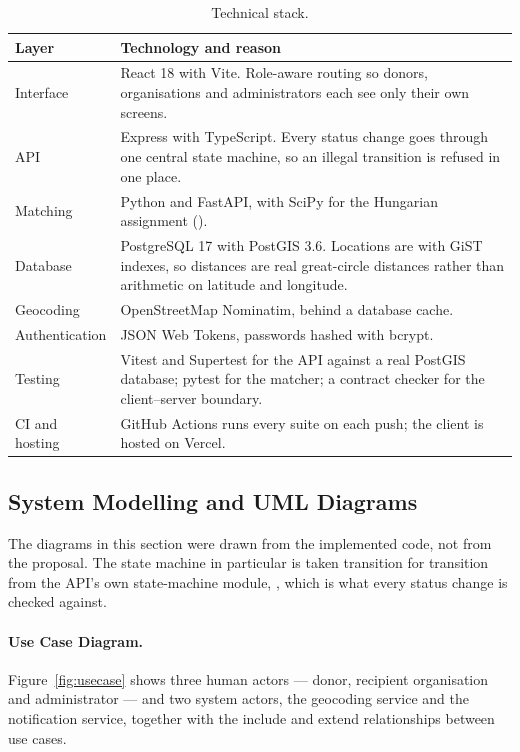 \documentclass[11pt,a4paper]{report}
\newcommand{\code}[1]{\texttt{\detokenize{#1}}}
\begin{document}
\begin{table}[H]
\centering
\small
\begin{tabularx}{\linewidth}{@{}l>{\raggedright\arraybackslash}X@{}}
\toprule
\textbf{Layer} & \textbf{Technology and reason} \\
\midrule
Interface & React 18 with Vite. Role-aware routing so donors, organisations and
  administrators each see only their own screens. \\
API & Express with TypeScript. Every status change goes through one central
  state machine, so an illegal transition is refused in one place. \\
Matching & Python and FastAPI, with SciPy for the Hungarian assignment
  (\code{linear_sum_assignment}). \\
Database & PostgreSQL 17 with PostGIS 3.6. Locations are
  \code{GEOGRAPHY(Point,4326)} with GiST indexes, so distances are real
  great-circle distances rather than arithmetic on latitude and longitude. \\
Geocoding & OpenStreetMap Nominatim, behind a database cache. \\
Authentication & JSON Web Tokens, passwords hashed with bcrypt. \\
Testing & Vitest and Supertest for the API against a real PostGIS database;
  pytest for the matcher; a contract checker for the client--server boundary. \\
CI and hosting & GitHub Actions runs every suite on each push; the client is
  hosted on Vercel. \\
\bottomrule
\end{tabularx}
\caption{Technical stack.}
\end{table}

\subsection{System Modelling and UML Diagrams}

The diagrams in this section were drawn from the implemented code, not from the
proposal. The state machine in particular is taken transition for transition
from the API's own state-machine module, \code{stateMachines.ts}, which is what
every status change is checked against.

\paragraph{Use Case Diagram.}
Figure~\ref{fig:usecase} shows three human actors --- donor, recipient
organisation and administrator --- and two system actors, the geocoding service
and the notification service, together with the include and extend
relationships between use cases.
\end{document}
